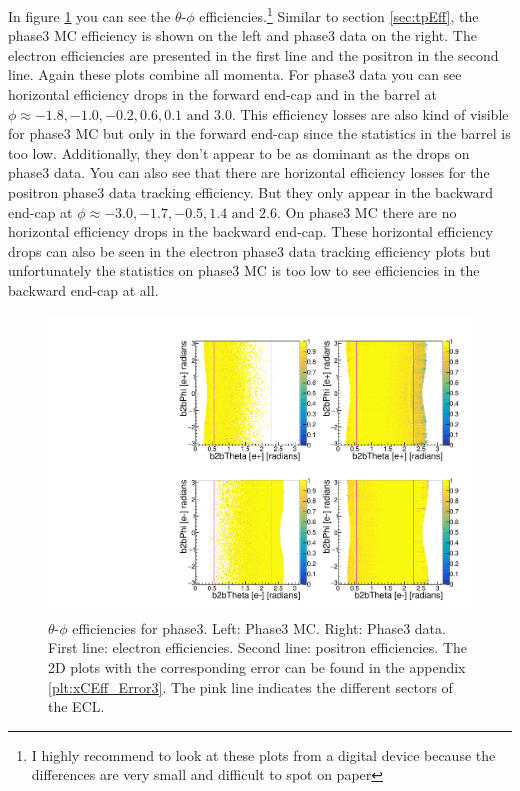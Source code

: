 \documentclass[a4paper,11pt,twosided,final,german,openbib,pdftex,listof=totoc,bibliography=totoc]{scrbook}
\begin{document}
In figure \ref{plt:xCEff3} you can see the $\theta$-$\phi$ efficiencies.\footnote{I highly recommend to look at these plots from a digital device because the differences are very small and difficult to spot on paper}
 Similar to section \ref{sec:tpEff}, the phase3 MC efficiency is shown on the left and phase3 data on the right. The electron efficiencies are presented in the first line and the positron in the second line. Again these plots combine all momenta. For phase3 data you can see horizontal efficiency drops in the forward end-cap and in the barrel at $\phi \approx -1.8, -1.0, -0.2, 0.6, 0.1 \textrm{ and }3.0$. This efficiency losses are also kind of visible for phase3 MC but only in the forward end-cap since the statistics in the barrel is too low. Additionally, they don't appear to be as dominant as the drops on phase3 data. You can also see that there are horizontal efficiency losses for the positron phase3 data tracking efficiency. But they only appear in the backward end-cap at $\phi \approx -3.0, -1.7, -0.5, 1.4 \textrm{ and } 2.6$. On phase3 MC there are no horizontal efficiency drops in the backward end-cap. These horizontal efficiency drops can also be seen in the electron phase3 data tracking efficiency plots but unfortunately the statistics on phase3 MC is too low to see efficiencies in the backward end-cap at all.



\begin{figure}[!htbp]
	\centering
	\includegraphics[width=\textwidth]{Plots/master3/xCEffTP_MCDataP3.pdf}
	\caption[$\theta$-$\phi$ Efficiency Plots Phase3]{$\theta$-$\phi$ efficiencies for phase3. Left: Phase3 MC. Right: Phase3 data. First line: electron efficiencies. Second line: positron efficiencies. The 2D plots with the corresponding error can be found in the appendix \ref{plt:xCEff_Error3}. The pink line indicates the different sectors of the ECL.}
	\label{plt:xCEff3}
\end{figure}
\end{document}
